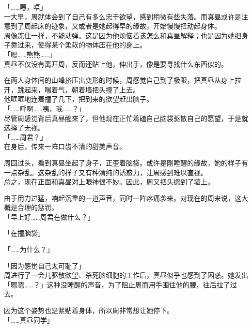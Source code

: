 「……嗯，唔」\\

一大早，周就体会到了自己有多么忠于欲望，感到稍微有些失落。而真昼或许是注意到了周起床的迹象，又或者是她起得早的缘故，开始慢慢扭动起身体。\\

周像冻住一样，不能动弹。这是因为他烦恼着该怎么和真昼解释；也是因为她把身子靠过来，使得某个柔软的物体压在他的身上。\\

「嗯……熊熊……」\\

真昼不仅没有离开周，反而还贴上他，伸出手，像是要寻找什么东西似的。

在两人身体间的山峰挤压出变形的时候，周感觉自己到了极限，把真昼从身上拉开，跳起来，喘着气，朝着墙把头撞了上去。\\

他哐哐地连着撞了几下，把到来的欲望赶出脑子。\\

「……呼啊……咦，我……？」\\

尽管周感觉背后真昼醒来了，但他现在正忙着磕自己脑袋驱散自己的愿望，于是就选择了无视。\\

「……周君？」\\

在身后，传来一阵口齿不清的甜美声音。

周回过头，看到真昼坐起了身子，正歪着脑袋。或许是刚睡醒的缘故，她的样子有一点杂乱。这杂乱的样子又有种清纯的诱惑力，让周感到难以直视。\\

总之，现在正面和真昼对上眼神很不妙。因此，周又把头摁到了墙上。

由于用力过猛，响起沉重的一道声音，同时一阵疼痛袭来。对现在的周来说，这大概是合理的惩罚。\\

「早上好……周君在做什么？」

「在撞脑袋」

「……为什么？」

「因为感觉自己太可耻了」\\

周进行了一会儿驱散欲望、杀死脑细胞的工作后，真昼似乎也感到了困惑。她发出「嗯嗯……？」这种没睡醒的声音，为了阻止周而用手围住他的腰，往后拉了过去。

因为这个姿势也是紧贴着身体，所以周非常想让她停下。\\

「……真昼同学」

